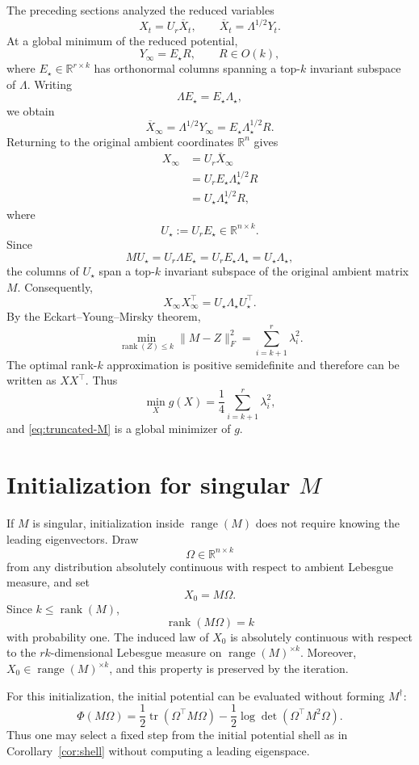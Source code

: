 \documentclass[11pt]{article}
\newcommand{\RR}{\mathbb{R}}
\newcommand{\rank}{\operatorname{rank}}
\newcommand{\range}{\operatorname{range}}
\newcommand{\tr}{\operatorname{tr}}
\begin{document}
The preceding sections analyzed the reduced variables
\[
X_t=U_r\overline X_t,
\qquad
\overline X_t=\Lambda^{1/2}Y_t.
\]
At a global minimum of the reduced potential,
\[
Y_\infty
=
E_\star R,
\qquad
R\in O(k),
\]
where \(E_\star\in\RR^{r\times k}\) has orthonormal columns spanning a
top-\(k\) invariant subspace of \(\Lambda\). Writing
\[
\Lambda E_\star
=
E_\star\Lambda_\star,
\]
we obtain
\[
\overline X_\infty
=
\Lambda^{1/2}Y_\infty
=
E_\star\Lambda_\star^{1/2}R.
\]
Returning to the original ambient coordinates \(\RR^n\) gives
\[
\begin{aligned}
X_\infty
&=
U_r\overline X_\infty\\
&=
U_rE_\star\Lambda_\star^{1/2}R\\
&=
U_\star\Lambda_\star^{1/2}R,
\end{aligned}
\]
where
\[
U_\star:=U_rE_\star\in\RR^{n\times k}.
\]
Since
\[
M U_\star
=
U_r\Lambda E_\star
=
U_rE_\star\Lambda_\star
=
U_\star\Lambda_\star,
\]
the columns of \(U_\star\) span a top-\(k\) invariant subspace of the original
ambient matrix \(M\). Consequently,
\[
X_\infty X_\infty^\top
=
U_\star\Lambda_\star U_\star^\top.
\tag{21}
\label{eq:truncated-M}
\]
By the Eckart--Young--Mirsky theorem,
\[
\min_{\rank(Z)\le k}\|M-Z\|_F^2
=
\sum_{i=k+1}^r\lambda_i^2.
\]
The optimal rank-\(k\) approximation is positive semidefinite and therefore
can be written as \(XX^\top\). Thus
\[
\min_X g(X)
=
\frac14\sum_{i=k+1}^r\lambda_i^2,
\]
and \eqref{eq:truncated-M} is a global minimizer of \(g\).

\section{Initialization for singular \texorpdfstring{\(M\)}{M}}
\label{sec:singular-init}

If \(M\) is singular, initialization inside \(\range(M)\) does not require
knowing the leading eigenvectors. Draw
\[
\Omega\in\RR^{n\times k}
\]
from any distribution absolutely continuous with respect to ambient Lebesgue
measure, and set
\[
X_0=M\Omega.
\tag{22}
\label{eq:random-init}
\]
Since \(k\le\rank(M)\),
\[
\rank(M\Omega)=k
\]
with probability one. The induced law of \(X_0\) is absolutely continuous with
respect to the \(rk\)-dimensional Lebesgue measure on
\(\range(M)^{\times k}\). Moreover, \(X_0\in\range(M)^{\times k}\), and this
property is preserved by the iteration.

For this initialization, the initial potential can be evaluated without
forming \(M^\dagger\):
\[
\Phi(M\Omega)
=
\frac12\tr(\Omega^\top M\Omega)
-
\frac12\log\det(\Omega^\top M^2\Omega).
\]
Thus one may select a fixed step from the initial potential shell as in
Corollary~\ref{cor:shell} without computing a leading eigenspace.
\end{document}
